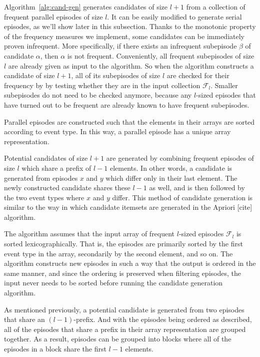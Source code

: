 Algorithm~\ref{alg:cand-gen} generates candidates of size $ l + 1 $ from a collection of frequent parallel episodes of size $ l $. It can be easily modified to generate serial episodes, as we'll show later in this subsection. Thanks to the monotonic property of the frequency measures we implement, some candidates can be immediately proven infrequent. More specifically, if there exists an infrequent subepisode $ \beta $ of candidate $ \alpha $, then $ \alpha $ is not frequent. Conveniently, all frequent subepisodes of size $ l $ are already given as input to the algorithm. So when the algorithm constructs a candidate of size $ l + 1 $, all of its subepisodes of size $ l $ are checked for their frequency by by testing whether they are in the input collection $ \mathcal{F}_l $. Smaller subepisodes do not need to be checked anymore, because any $ l $-sized episodes that have turned out to be frequent are already known to have frequent subepisodes.

Parallel episodes are constructed such that the elements in their arrays are sorted according to event type. In this way, a parallel episode has a unique array representation.

Potential candidates of size $ l + 1 $ are generated by combining frequent episodes of size $ l $ which share a prefix of $ l - 1 $ elements. In other words, a candidate is generated from episodes $ x $ and $ y $ which differ only in their last element. The newly constructed candidate shares these $ l - 1 $ as well, and is then followed by the two event types where $ x $ and $ y $ differ. This method of candidate generation is similar to the way in which candidate itemsets are generated in the Apriori [cite] algorithm.


The algorithm assumes that the input array of frequent $ l $-sized episodes $ \mathcal{F}_l $ is sorted lexicographically. That is, the episodes are primarily sorted by the first event type in the array, secondarily by the second element, and so on. The algorithm constructs new episodes in such a way that the output is ordered in the same manner, and since the ordering is preserved when filtering episodes, the input never needs to be sorted before running the candidate generation algorithm.

As mentioned previously, a potential candidate is generated from two episodes that share an $ (l - 1) $-prefix. And with the episodes being ordered as described, all of the episodes that share a prefix in their array representation are grouped together. As a result, episodes can be grouped into blocks where all of the episodes in a block share the first $ l - 1 $ elements.

